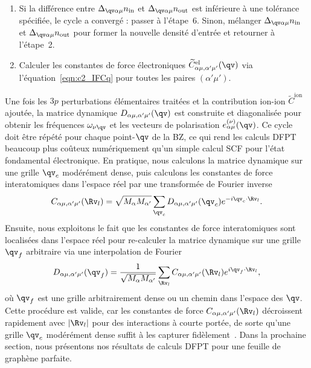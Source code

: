 \begin{enumerate}
    \item Si la différence entre $\Delta_{\qv\alpha\mu}n_\text{in}$ 
    et $\Delta_{\qv\alpha\mu}n_\text{out}$ est inférieure à une 
    tolérance spécifiée, le cycle a convergé : passer à l'étape~6. 
    Sinon, mélanger $\Delta_{\qv\alpha\mu}n_\text{in}$ et 
    $\Delta_{\qv\alpha\mu}n_\text{out}$ pour former la nouvelle 
    densité d'entrée et retourner à l'étape~2.

    \item Calculer les constantes de force électroniques 
    $\widetilde{C}^\text{el}_{\alpha\mu,\alpha'\mu'}(\qv)$ via 
    l'équation~\eqref{eqn:c2_IFCq} pour toutes les paires 
    $(\alpha'\mu')$.
\end{enumerate}
Une fois les $3p$ perturbations élémentaires traitées et la 
contribution ion-ion $\widetilde{C}^\text{ion}$ ajoutée, la 
matrice dynamique $D_{\alpha\mu,\alpha'\mu'}(\qv)$ est construite 
et diagonalisée pour obtenir les fréquences $\omega_{\nu\qv}$ et 
les vecteurs de polarisation $e_{\alpha\mu}^{(\nu)}(\qv)$. Ce cycle doit être répété pour chaque point-$\qv$ de la BZ, ce qui rend les calculs DFPT beaucoup plus coûteux numériquement qu'un simple calcul SCF pour l'état fondamental électronique. En pratique, nous calculons la matrice dynamique sur une grille $\qv_c$ modérément dense, puis calculons les constantes de force interatomiques dans l'espace réel par une transformée de Fourier inverse
\begin{equation}
    C_{\alpha\mu,\alpha'\mu'}(\Rv_l) =\sqrt{M_\alpha M_{\alpha'}}\sum_{\qv_c}D_{\alpha\mu,\alpha'\mu'}(\qv_c)e^{-i\qv_c\cdot\Rv_l}.
\end{equation}
Ensuite, nous exploitons le fait que les constantes de force interatomiques sont localisées dans l'espace réel pour re-calculer la matrice dynamique sur une grille $\qv_f$ arbitraire via une interpolation de Fourier
\begin{equation}
    D_{\alpha\mu,\alpha'\mu'}(\qv_f)=\frac{1}{\sqrt{M_\alpha M_{\alpha'}}}\sum_{\Rv_l}C_{\alpha\mu,\alpha'\mu'}(\Rv_l)e^{i\qv_f\cdot\Rv_l},
\end{equation}
où $\qv_f$ est une grille arbitrairement dense ou un chemin dans l'espace des $\qv$. Cette procédure est valide, car les constantes de force 
$C_{\alpha\mu,\alpha'\mu'}(\Rv_l)$ décroissent rapidement avec 
$|\Rv_l|$ pour des interactions à courte portée, de sorte qu'une 
grille $\qv_c$ modérément dense suffit à les capturer 
fidèlement~\cite{baroniPhononsRelatedCrystal2001a}. Dans la prochaine section, nous présentons nos résultats de calculs DFPT pour une feuille de graphène parfaite.

